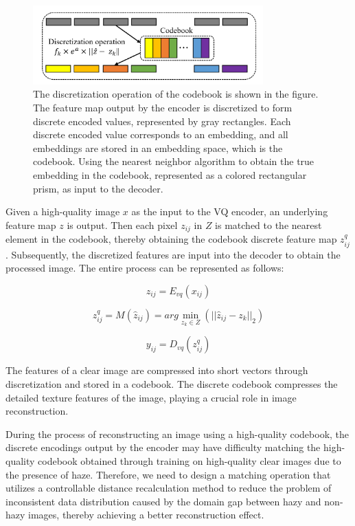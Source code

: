\documentclass[journal]{IEEEtran}
\begin{document}
\begin{figure}[!t]
	\centering
	\includegraphics[width=3.49in]{images/discretization_operation}
	\caption{The discretization operation of the codebook is shown in the figure. The feature map output by the encoder is discretized to form discrete encoded values, represented by gray rectangles. Each discrete encoded value corresponds to an embedding, and all embeddings are stored in an embedding space, which is the codebook. Using the nearest neighbor algorithm to obtain the true embedding in the codebook, represented as a colored rectangular prism, as input to the decoder.}
	\label{fig2}
\end{figure}

Given a high-quality image $x$ as the input to the VQ encoder, an underlying feature map $z$ is output. Then each pixel $z_{ij}$ in $Z$ is matched to the nearest element in the codebook, thereby obtaining the codebook discrete feature map $z^{q}_{ij}$. Subsequently, the discretized features are input into the decoder to obtain the processed image. The entire process can be represented as follows:

\begin{equation}
	\label{vq_equation_1}
	z_{ij} = E_{vq}(x_{ij})
\end{equation}

\begin{equation}
	\label{vq_equation_2}
	z_{ij}^{q} = M(\widehat{z}_{ij}) = arg \min_{z_{k} \in Z} (|| \widehat{z}_{ij} - z_{k} ||_{2})
\end{equation}

\begin{equation}
	\label{vq_equation_3}
	y_{ij} = D_{vq}(z_{ij}^{q})
\end{equation}

The features of a clear image are compressed into short vectors through discretization and stored in a codebook. The discrete codebook compresses the detailed texture features of the image, playing a crucial role in image reconstruction.

During the process of reconstructing an image using a high-quality codebook, the discrete encodings output by the encoder may have difficulty matching the high-quality codebook obtained through training on high-quality clear images due to the presence of haze. Therefore, we need to design a matching operation that utilizes a controllable distance recalculation method to reduce the problem of inconsistent data distribution caused by the domain gap between hazy and non-hazy images, thereby achieving a better reconstruction effect.
\end{document}
